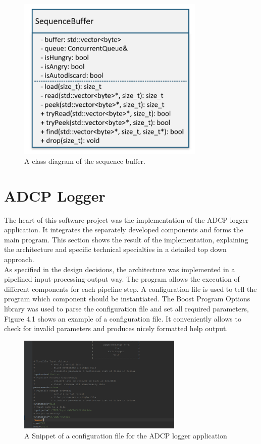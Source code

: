 \begin{figure}[h]
\centering
      \includegraphics[width=0.8\textwidth]{seqbuf}
        \caption{A class diagram of the sequence buffer.}
\end{figure}

\section{ADCP Logger}
The heart of this software project was the implementation of the ADCP logger application. It integrates the separately developed components and forms the main program. This section shows the result of the implementation, explaining the architecture and specific technical specialties in a detailed top down approach.\\
As specified in the design decisions, the architecture was implemented in a pipelined input-processing-output way. The program allows the execution of different components for each pipeline step. A configuration file is used to tell the program which component should be instantiated. The Boost Program Options library was used to parse the configuration file and set all required parameters, Figure 4.1 shows an example of a configuration file. It conveniently allows to check for invalid parameters and produces nicely formatted help output.

\begin{figure}[h]
\centering
      \includegraphics[width=0.7\textwidth]{config}
        \caption{A Snippet of a configuration file for the ADCP logger application}
\end{figure}

